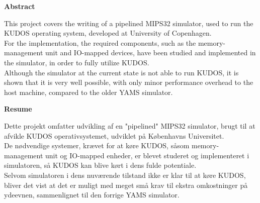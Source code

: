 \begin{center}
\textbf{Abstract}\\
\end{center}
This project covers the writing of a pipelined MIPS32 simulator, used to run the
KUDOS operating system, developed at University of Copenhagen.\\
For the implementation, the required components, such as the memory-management
unit and IO-mapped devices, have been studied and implemented in the simulator,
in order to fully utilize KUDOS.\\
Although the simulator at the current state is not able to run KUDOS, it is shown
that it is very well possible, with only minor performance overhead to the host
machine, compared to the older YAMS simulator.




\begin{center}
\textbf{Resume}\\
\end{center}
Dette projekt omfatter udvikling af en "pipelined" MIPS32 simulator, brugt til at
afvikle KUDOS operativsystemet, udviklet på Københavns Universitet.\\
De nødvendige systemer, krævet for at køre KUDOS, såsom memory-management unit og IO-mapped
enheder, er blevet studeret og implementeret i simulatoren, så KUDOS kan blive kørt
i dens fulde potentiale.\\
Selvom simulatoren i dens nuværende tilstand ikke er klar til at køre KUDOS, bliver
det vist at det er muligt med meget små krav til ekstra omkostninger på
ydeevnen, sammenlignet til den forrige YAMS simulator.

